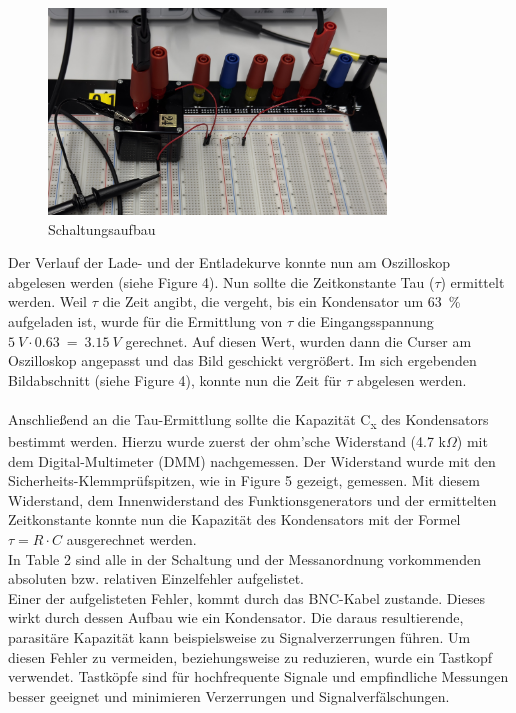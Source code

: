 \documentclass[a4paper,12pt]{article}
\begin{document}
\begin{figure}[H]
    \centering
    \includegraphics[width=0.8\textwidth]{../Quellen/Labor2/IMG_3965 - Kopie.jpeg}
\caption{Schaltungsaufbau}
\end{figure}

\noindent Der Verlauf der Lade- und der Entladekurve konnte nun am Oszilloskop abgelesen werden (siehe Figure 4). Nun sollte die Zeitkonstante Tau ($\tau$) ermittelt werden. Weil $\tau$ die Zeit angibt, die vergeht, bis ein Kondensator um 63~\% aufgeladen ist, wurde für die Ermittlung von $\tau$ die Eingangsspannung \(5~V \cdot 0.63~=~3.15~V\) gerechnet. Auf diesen Wert, wurden dann die Curser am Oszilloskop angepasst und das Bild geschickt vergrößert. Im sich ergebenden Bildabschnitt (siehe Figure 4), konnte nun die Zeit für $\tau$ abgelesen werden.\\\\
Anschließend an die Tau-Ermittlung sollte die Kapazität C\textsubscript{x} des Kondensators bestimmt werden. Hierzu wurde zuerst der ohm'sche Widerstand (4.7 k$\Omega$) mit dem Digital-Multimeter (DMM) nachgemessen. Der Widerstand wurde mit den Sicherheits-Klemmprüfspitzen, wie in Figure 5 gezeigt, gemessen. Mit diesem Widerstand, dem Innenwiderstand des Funktionsgenerators und der ermittelten Zeitkonstante konnte nun die Kapazität des Kondensators mit der Formel $\tau = R \cdot C$ ausgerechnet werden.\\
In Table 2 sind alle in der Schaltung und der Messanordnung vorkommenden absoluten bzw. relativen Einzelfehler aufgelistet.\\Einer der aufgelisteten Fehler, kommt durch das BNC-Kabel zustande. Dieses wirkt durch dessen Aufbau wie ein Kondensator. Die daraus resultierende, parasitäre Kapazität kann beispielsweise zu Signalverzerrungen führen. Um diesen Fehler zu vermeiden, beziehungsweise zu reduzieren, wurde ein Tastkopf verwendet. Tastköpfe sind für hochfrequente Signale und empfindliche Messungen besser geeignet und minimieren Verzerrungen und Signalverfälschungen.
\end{document}
